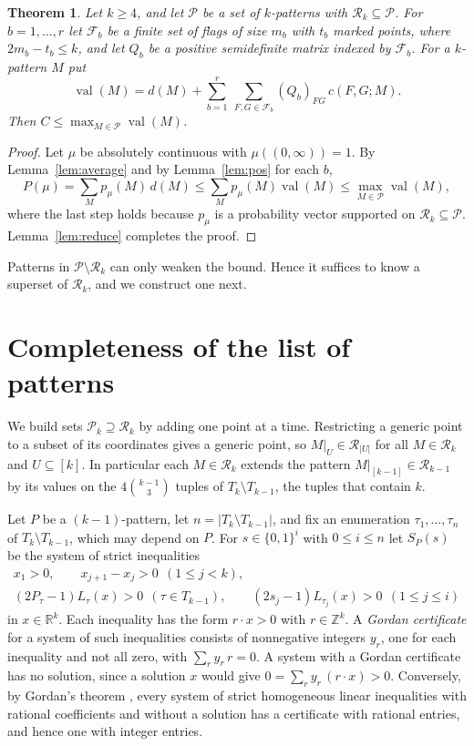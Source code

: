 \documentclass[11pt]{amsart}
\newtheorem{theorem}{Theorem}[section]
\theoremstyle{definition}
\theoremstyle{remark}
\numberwithin{equation}{section}
\newcommand{\R}{\mathbb{R}}
\newcommand{\Z}{\mathbb{Z}}
\newcommand{\cR}{\mathcal{R}}
\newcommand{\cP}{\mathcal{P}}
\newcommand{\cF}{\mathcal{F}}
\newcommand{\val}{\operatorname{val}}
\begin{document}
\begin{theorem}\label{thm:bound}
Let $k\ge4$, and let $\cP$ be a set of $k$-patterns with $\cR_k\subseteq\cP$. For $b=1,\dots,r$ let $\cF_b$ be a finite set of flags of size $m_b$ with $t_b$ marked points, where $2m_b-t_b\le k$, and let $Q_b$ be a positive semidefinite matrix indexed by $\cF_b$. For a $k$-pattern $M$ put
\begin{equation}\label{eq:val}
\val(M)=d(M)+\sum_{b=1}^r\ \sum_{F,G\in\cF_b}(Q_b)_{FG}\,c(F,G;M).
\end{equation}
Then $C\le\max_{M\in\cP}\val(M)$.
\end{theorem}

\begin{proof}
Let $\mu$ be absolutely continuous with $\mu((0,\infty))=1$. By Lemma~\ref{lem:average} and by Lemma~\ref{lem:pos} for each $b$,
\[
P(\mu)=\sum_Mp_\mu(M)\,d(M)\le\sum_Mp_\mu(M)\val(M)\le\max_{M\in\cP}\val(M),
\]
where the last step holds because $p_\mu$ is a probability vector supported on $\cR_k\subseteq\cP$. Lemma~\ref{lem:reduce} completes the proof.
\end{proof}

Patterns in $\cP\setminus\cR_k$ can only weaken the bound. Hence it suffices to know a superset of $\cR_k$, and we construct one next.

\section{Completeness of the list of patterns}\label{sec:complete}

We build sets $\cP_k\supseteq\cR_k$ by adding one point at a time. Restricting a generic point to a subset of its coordinates gives a generic point, so $M|_U\in\cR_{|U|}$ for all $M\in\cR_k$ and $U\subseteq[k]$. In particular each $M\in\cR_k$ extends the pattern $M|_{[k-1]}\in\cR_{k-1}$ by its values on the $4\binom{k-1}3$ tuples of $T_k\setminus T_{k-1}$, the tuples that contain $k$.

Let $P$ be a $(k-1)$-pattern, let $n=|T_k\setminus T_{k-1}|$, and fix an enumeration $\tau_1,\dots,\tau_n$ of $T_k\setminus T_{k-1}$, which may depend on $P$. For $s\in\{0,1\}^i$ with $0\le i\le n$ let $S_P(s)$ be the system of strict inequalities
\begin{gather*}
x_1>0,\qquad x_{j+1}-x_j>0\ \ (1\le j<k),\\
(2P_\tau-1)L_\tau(x)>0\ \ (\tau\in T_{k-1}),\qquad (2s_j-1)L_{\tau_j}(x)>0\ \ (1\le j\le i)
\end{gather*}
in $x\in\R^k$. Each inequality has the form $r\cdot x>0$ with $r\in\Z^k$. A \emph{Gordan certificate} for a system of such inequalities consists of nonnegative integers $y_r$, one for each inequality and not all zero, with $\sum_ry_r\,r=0$. A system with a Gordan certificate has no solution, since a solution $x$ would give $0=\sum_ry_r\,(r\cdot x)>0$. Conversely, by Gordan's theorem \cite{Gor73}, every system of strict homogeneous linear inequalities with rational coefficients and without a solution has a certificate with rational entries, and hence one with integer entries.
\end{document}
